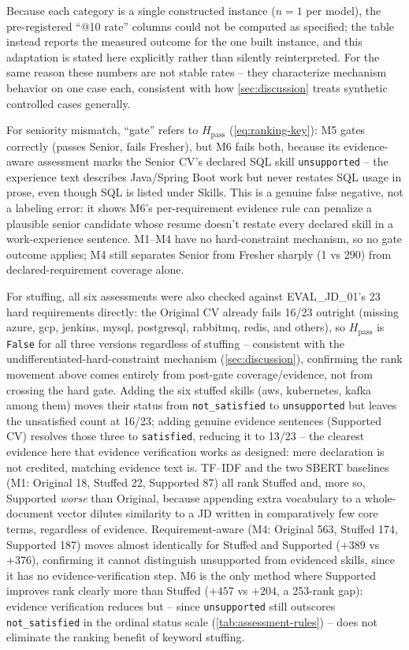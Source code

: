 \documentclass[12pt,a4paper,oneside]{report}
\begin{document}
Because each category is a single constructed instance ($n=1$ per model), the pre-registered ``@10 rate'' columns could not be computed as specified; the table instead reports the measured outcome for the one built instance, and this adaptation is stated here explicitly rather than silently reinterpreted. For the same reason these numbers are not stable rates -- they characterize mechanism behavior on one case each, consistent with how \cref{sec:discussion} treats synthetic controlled cases generally.

For seniority mismatch, ``gate'' refers to $H_{\mathrm{pass}}$ (\cref{eq:ranking-key}): M5 gates correctly (passes Senior, fails Fresher), but M6 fails both, because its evidence-aware assessment marks the Senior CV's declared SQL skill \texttt{unsupported} -- the experience text describes Java/Spring Boot work but never restates SQL usage in prose, even though SQL is listed under Skills. This is a genuine false negative, not a labeling error: it shows M6's per-requirement evidence rule can penalize a plausible senior candidate whose resume doesn't restate every declared skill in a work-experience sentence. M1--M4 have no hard-constraint mechanism, so no gate outcome applies; M4 still separates Senior from Fresher sharply (1 vs 290) from declared-requirement coverage alone.

For stuffing, all six assessments were also checked against EVAL\_JD\_01's 23 hard requirements directly: the Original CV already fails 16/23 outright (missing azure, gcp, jenkins, mysql, postgresql, rabbitmq, redis, and others), so $H_{\mathrm{pass}}$ is \texttt{False} for all three versions regardless of stuffing -- consistent with the undifferentiated-hard-constraint mechanism (\cref{sec:discussion}), confirming the rank movement above comes entirely from post-gate coverage/evidence, not from crossing the hard gate. Adding the six stuffed skills (aws, kubernetes, kafka among them) moves their status from \texttt{not\_satisfied} to \texttt{unsupported} but leaves the unsatisfied count at 16/23; adding genuine evidence sentences (Supported CV) resolves those three to \texttt{satisfied}, reducing it to 13/23 -- the clearest evidence here that evidence verification works as designed: mere declaration is not credited, matching evidence text is. TF--IDF and the two SBERT baselines (M1: Original 18, Stuffed 22, Supported 87) all rank Stuffed and, more so, Supported \emph{worse} than Original, because appending extra vocabulary to a whole-document vector dilutes similarity to a JD written in comparatively few core terms, regardless of evidence. Requirement-aware (M4: Original 563, Stuffed 174, Supported 187) moves almost identically for Stuffed and Supported ($+389$ vs $+376$), confirming it cannot distinguish unsupported from evidenced skills, since it has no evidence-verification step. M6 is the only method where Supported improves rank clearly more than Stuffed ($+457$ vs $+204$, a 253-rank gap): evidence verification reduces but -- since \texttt{unsupported} still outscores \texttt{not\_satisfied} in the ordinal status scale (\cref{tab:assessment-rules}) -- does not eliminate the ranking benefit of keyword stuffing.
\end{document}
